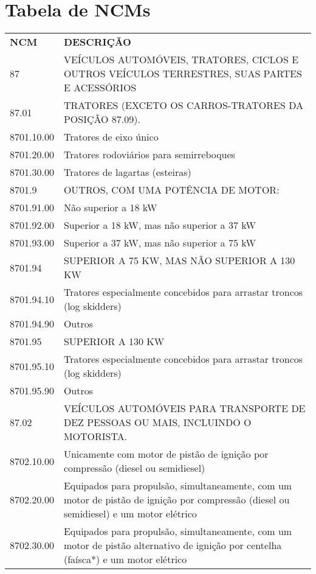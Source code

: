 \documentclass{article}
\begin{document}
\section{Tabela de NCMs}
\begin{center}
  \begin{longtable}{
    |p{}
    |p{}|
  }
    \hline
    \rowcolor{darkGrey}
    \textbf{NCM} & \textbf{DESCRIÇÃO} \\
    87 & VEÍCULOS AUTOMÓVEIS, TRATORES, CICLOS E OUTROS VEÍCULOS TERRESTRES, SUAS PARTES E ACESSÓRIOS \\
    87.01 & TRATORES (EXCETO OS CARROS-TRATORES DA POSIÇÃO 87.09). \\
    8701.10.00 & Tratores de eixo único \\
    8701.20.00 & Tratores rodoviários para semirreboques \\
    8701.30.00 & Tratores de lagartas (esteiras) \\
    8701.9 & OUTROS, COM UMA POTÊNCIA DE MOTOR: \\
    8701.91.00 & Não superior a 18 kW \\
    8701.92.00 & Superior a 18 kW, mas não superior a 37 kW \\
    8701.93.00 & Superior a 37 kW, mas não superior a 75 kW \\
    8701.94 & SUPERIOR A 75 KW, MAS NÃO SUPERIOR A 130 KW \\
    8701.94.10 & Tratores especialmente concebidos para arrastar troncos (log skidders) \\
    8701.94.90 & Outros \\
    8701.95 & SUPERIOR A 130 KW \\
    8701.95.10 & Tratores especialmente concebidos para arrastar troncos (log skidders) \\
    8701.95.90 & Outros \\
    87.02 & VEÍCULOS AUTOMÓVEIS PARA TRANSPORTE DE DEZ PESSOAS OU MAIS, INCLUINDO O MOTORISTA. \\
    8702.10.00 & Unicamente com motor de pistão de ignição por compressão (diesel ou semidiesel) \\
    8702.20.00 & Equipados para propulsão, simultaneamente, com um motor de pistão de ignição por compressão (diesel ou semidiesel) e um motor elétrico \\
    8702.30.00 & Equipados para propulsão, simultaneamente, com um motor de pistão alternativo de ignição por centelha (faísca*) e um motor elétrico \\

\end{longtable}
\end{center}
\end{document}
